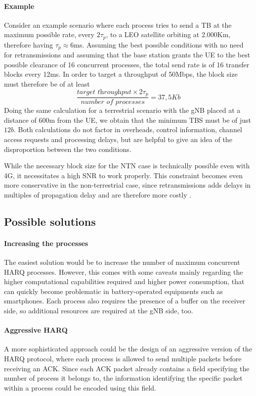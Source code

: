 \paragraph{Example} Consider an example scenario where each process tries to send a \ac{TB} at the maximum possible rate, every $2\tau_p$, to a \ac{LEO} satellite orbiting at 2.000Km, therefore having $\tau_p\approx6$ms. Assuming the best possible conditions with no need for retransmissions and assuming that the base station grants the \ac{UE} to the best possible clearance of 16 concurrent processes, the total send rate is of 16 transfer blocks every 12ms. In order to target a throughput of 50Mbps, the block size must therefore be of at least $$\frac{\textit{target throughput} \times 2\tau_p}{\textit{number of processes}} = 37,5Kb$$
Doing the same calculation for a terrestrial scenario with the \ac{gNB} placed at a distance of 600m from the \ac{UE}, we obtain that the minimum \ac{TBS} must be of just $12b$.
Both calculations do not factor in overheads, control information, channel access requests and processing delays, but are helpful to give an idea of the disproportion between the two conditions.

While the necessary block size for the \ac{NTN} case is technically possible even with 4G, it necessitates a high \ac{SNR} to work properly. This constraint becomes even more conservative in the non-terrestrial case, since retransmissions adds delays in multiples of propagation delay and are therefore more costly \cite{4g-phy-processing-sharetechnote}.

\subsection{Possible solutions}
\paragraph{Increasing the processes}
The easiest solution would be to increase the number of maximum concurrent \ac{HARQ} processes. However, this comes with some caveats mainly regarding the higher computational capabilities required and higher power consumption, that can quickly become problematic in battery-operated equipments such as smartphones. Each process also requires the presence of a buffer on the receiver side, so additional resources are required at the \ac{gNB} side, too. 
\paragraph{Aggressive HARQ}
A more sophisticated approach could be the design of an aggressive version of the \ac{HARQ} protocol, where each process is allowed to send multiple packets before receiving an \ac{ACK}. Since each \ac{ACK} packet already contains a field specifying the number of process it belongs to, the information identifying the specific packet within a process could be encoded using this field.

